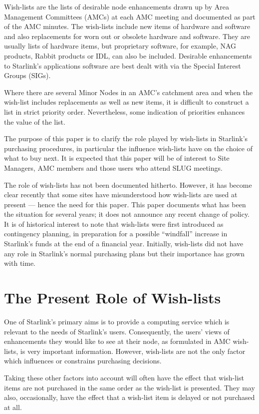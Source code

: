 Wish-lists are the lists of desirable node enhancements drawn
up by Area Management Committees (AMCs) at each AMC meeting and
documented as part of the AMC minutes.  The wish-lists include new items
of hardware and software and also replacements for worn out or obsolete
hardware and software.  They are usually lists of hardware items, but
proprietary software, for example, NAG products, Rabbit products or IDL, can
also be included.  Desirable enhancements to Starlink's applications software
are best dealt with via the Special Interest Groups (SIGs).

Where there are several Minor Nodes in an AMC's catchment area
and when the wish-list includes replacements as well as new items,
it is difficult to construct a list in strict priority order.
Nevertheless, some indication of priorities enhances the value of the list.

The purpose of this paper is to clarify the role played by wish-lists
in Starlink's purchasing procedures, in particular the influence wish-lists
have on the choice of what to buy next.  It is expected that this paper will
be of interest to Site Managers, AMC members and those users who attend
SLUG meetings.

The role of wish-lists has not been documented hitherto.  However, it has
become clear recently that some sites have misunderstood how wish-lists
are used at present --- hence
the need for this paper.  This paper documents what has been the situation for
several years; it does not announce any recent change of policy.  It is of
historical interest to note that wish-lists were first introduced as contingency
planning, in preparation for a possible ``windfall'' increase in Starlink's
funds at the end of a financial year.  Initially, wish-lists did not have any
role in Starlink's normal purchasing plans but their importance
has grown with time.

\section  {The Present Role of Wish-lists}

One of Starlink's primary aims is to provide a computing service
which is relevant
to the needs of Starlink's users.  Consequently, the users' views of
enhancements
they would like to see at their node, as formulated in AMC wish-lists,
is very important information.  However, wish-lists are not the only
factor which influences or constrains purchasing decisions.

Taking these other factors into account will often have the effect that
wish-list items are not purchased in the same order as the wish-list
is presented.  They may also, occasionally, have the effect that a
wish-list item is delayed or not purchased at all.


